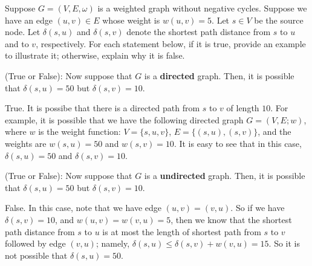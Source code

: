 \begin{prob}
    Suppose $G = (V, E, \omega)$ is a weighted graph without negative cycles. 
        Suppose we have an edge $(u, v) \in E$ whose weight is $w(u, v) = 5$. 
        Let $s\in V$ be the source node. Let $\delta(s, u)$ and $\delta(s, v)$ denote the shortest path distance from $s$ to $u$ and to $v$, respectively.
        For each statement below, if it is true, provide an example to illustrate it; otherwise, explain why it is false.
        
        
    \begin{subprobset}
        \begin{subprob}
       (True or False):  Now suppose that $G$ is a {\bf directed} graph. 
        Then, it is possible that $\delta(s, u) = 50$ but $\delta(s, v) = 10$. 
            \begin{soln}
                True.
            It is possibe that there is a directed path from $s$ to $v$ of length $10$. For example, it is possible that we have the following directed graph $G = (V, E; w)$, where $w$ is the weight function: $V = \{s, u, v\}$, $E = \{(s, u), (s, v) \}$, and the weights are $w(s, u) = 50$ and $w(s, v) = 10$. It is easy to see that in this case, $\delta(s, u) = 50$ and $\delta(s, v) = 10$.  
            \end{soln}
            \end{subprob}
            \begin{subprob}
                (True or False): Now suppose that $G$ is a {\bf undirected} graph. 
                Then, it is possible that  $\delta(s, u) = 50$ but $\delta(s, v) = 10$. 
            \begin{soln}
                False. 
                In this case, note that we have edge $(u, v)  = (v, u)$. So if we have $\delta(s, v) = 10$, and $w(u,v) = w(v,u) = 5$, then we know that the shortest path distance from $s$ to $u$ is at most the length of shortest path from $s$ to $v$ followed by edge $(v, u)$; namely, $\delta(s, u) \le \delta(s, v) + w(v, u) = 15$. So it is not possible that $\delta(s, u) = 50$. 
            \end{soln}
        \end{subprob}
    \end{subprobset}
    
\end{prob}
    
